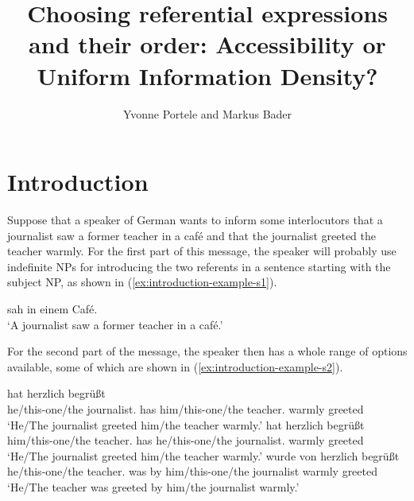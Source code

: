 \documentclass[output=paper,colorlinks,citecolor=brown]{langscibook}
\title[Choosing referential expressions and their order]{Choosing referential expressions and their order: Accessibility or Uniform Information Density?}
\author{Yvonne Portele\orcid{0000-0001-8823-4335}\affiliation{Goethe University Frankfurt} and Markus Bader\orcid{0000-0002-9765-8970}\affiliation{Goethe University Frankfurt}}
\begin{document}
\maketitle

\section{Introduction}

Suppose that a speaker of German wants to inform some interlocutors that a journalist saw a former teacher in a café and that the journalist greeted the teacher warmly. For the first part of this message, the speaker will probably use indefinite NPs for introducing the two referents in a sentence starting with the subject NP, as shown in (\ref{ex:introduction-example-s1}).

\ea \label{ex:introduction-example}
   sah    in einem Café.\\
\enquote*{A journalist saw a former teacher {in a} café.}
\label{ex:introduction-example-s1}
\z

For the second part of the message, the speaker then has a whole range of options available, some of which are shown in  (\ref{ex:introduction-example-s2}). 

\ea \label{ex:introduction-example-s2}
\ea \gll {} hat  herzlich begrüßt\label{ex:SO}\\
          {he/this-one/{the journalist}.\NOM} has {him/this-one/{the teacher}.\ACC} warmly greeted\\
     \glt \enquote*{He/The journalist greeted him/the teacher warmly.}
\ex \gll {} hat  herzlich begrüßt\label{ex:OS}\\
          {him/this-one/{the teacher}.\ACC} has {he/this-one/{the journalist}.\NOM} warmly greeted\\
     \glt \enquote*{He/The journalist greeted him/the teacher warmly.}
\ex \gll {} wurde von  herzlich begrüßt\label{ex:pas}\\
          {he/this-one/{the teacher}.\NOM} was by him/this-one/{the journalist} warmly greeted\\
     \glt \enquote*{He/The teacher was greeted by him/the journalist warmly.}
\z
\z
\end{document}
